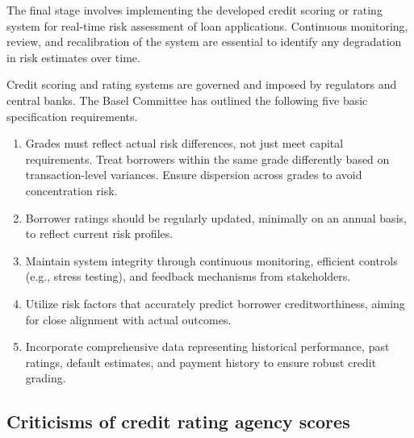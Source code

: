 The final stage involves implementing the developed credit scoring or rating
system for real-time risk assessment of loan applications. Continuous monitoring,
review, and recalibration of the system are essential to identify any degradation
in risk estimates over time.


Credit scoring and rating systems are governed and imposed by regulators and
central banks. The Basel Committee has outlined the following five basic
specification requirements.

\begin{enumerate}
\item {} Grades must reflect actual risk differences,
not just meet capital requirements. Treat borrowers within the same grade
differently based on transaction-level variances. Ensure dispersion across grades
to avoid concentration risk.
\item {} Borrower ratings should be regularly updated,
minimally on an annual basis, to reflect current risk profiles.
\item {} Maintain system integrity through continuous
monitoring, efficient controls (e.g., stress testing), and feedback mechanisms
from stakeholders.
\item {} Utilize risk factors that accurately predict
borrower creditworthiness, aiming for close alignment with actual outcomes.
\item {} Incorporate comprehensive data representing
historical performance, past ratings, default estimates, and payment history to
ensure robust credit grading.
\end{enumerate}

\subsection*{Criticisms of credit rating agency scores}

